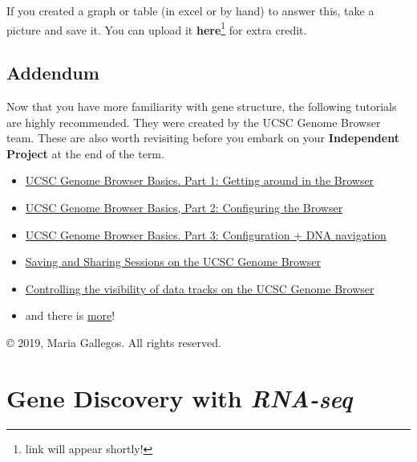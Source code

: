 \documentclass[
]{book}
\providecommand{\tightlist}{%
  \setlength{\itemsep}{0pt}\setlength{\parskip}{0pt}}
\begin{document}
If you created a graph or table (in excel or by hand) to answer this, take a picture and save it. You can upload it \textbf{here}\footnote{link will appear shortly!} for extra credit.

\hypertarget{addendum}{%
\section{Addendum}\label{addendum}}

Now that you have more familiarity with gene structure, the following tutorials are highly recommended. They were created by the UCSC Genome Browser team. These are also worth revisiting before you embark on your \textbf{Independent Project} at the end of the term.

\begin{itemize}
\tightlist
\item
  \href{https://www.youtube.com/watch?v=NBDMNv2KFik\&feature=youtu.be\&list=UUQnUJepyNOw0p8s2otX4RYQ}{UCSC Genome Browser Basics. Part 1: Getting around in the Browser}
\item
  \href{https://www.youtube.com/watch?v=cYys5iXN0NY\&feature=youtu.be\&list=UUQnUJepyNOw0p8s2otX4RYQ}{UCSC Genome Browser Basics, Part 2: Configuring the Browser}
\item
  \href{https://www.youtube.com/watch?v=I25Q136d6NU\&feature=youtu.be\&list=UUQnUJepyNOw0p8s2otX4RYQ}{UCSC Genome Browser Basics. Part 3: Configuration + DNA navigation}
\item
  \href{https://www.youtube.com/watch?v=d5rHBLXwraM\&feature=youtu.be\&feature=player_detailpage\&v=8ATcoDTOc0g\&list=UUQnUJepyNOw0p8s2otX4RYQ}{Saving and Sharing Sessions on the UCSC Genome Browser}
\item
  \href{https://www.youtube.com/watch?v=jKix2B3hwnw\&feature=youtu.be\&feature=player_detailpage\&v=8ATcoDTOc0g\&list=UUQnUJepyNOw0p8s2otX4RYQ}{Controlling the visibility of data tracks on the UCSC Genome Browser}
\item
  and there is \href{https://genome.ucsc.edu/training/}{more}!
\end{itemize}

© 2019, Maria Gallegos. All rights reserved.

\hypertarget{gene-discovery-with-rna-seq}{%
\chapter{\texorpdfstring{Gene Discovery with \emph{RNA-seq}}{Gene Discovery with RNA-seq}}\label{gene-discovery-with-rna-seq}}
\end{document}
